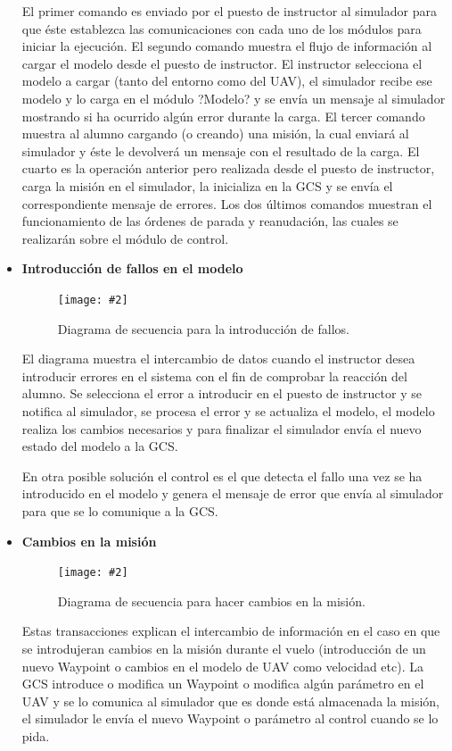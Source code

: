 \documentclass[12pt,a4paper,spanish]{book} %
\newcommand{\imgCentradaGrande}[3]{
\begin{figure}[H]
\begin{center}
\texttt{[image: \#2]}
\caption{#3}
\label{#1}
\end{center}
\end{figure}
}
\begin{document}
\begin{itemize}
El primer comando es enviado por el puesto de instructor al simulador para que éste establezca las comunicaciones con cada uno de los módulos para iniciar la ejecución.
El segundo comando muestra el flujo de información al cargar el modelo desde el puesto de instructor. El instructor selecciona el modelo a cargar (tanto del entorno como del UAV), el simulador recibe ese modelo y lo carga en el módulo ?Modelo? y se envía un mensaje al simulador mostrando si ha ocurrido algún error durante la carga.
El tercer comando muestra al alumno cargando (o creando) una misión, la cual enviará al simulador y éste le devolverá un mensaje con el resultado de la carga.
El cuarto es la operación anterior pero realizada desde el puesto de instructor, carga la misión en el simulador, la inicializa en la GCS y se envía el correspondiente mensaje de errores.
Los dos últimos comandos muestran el funcionamiento de las órdenes de parada y reanudación, las cuales se realizarán sobre el módulo de control.

\item\textbf{Introducción de fallos en el modelo}

\imgCentradaGrande{fig.4.5}{img/introduccionfallos.eps}{Diagrama de secuencia para la introducción de fallos.}

El diagrama muestra el intercambio de datos cuando el instructor desea introducir errores en el sistema con el fin de comprobar la reacción del alumno. Se selecciona el error a introducir en el puesto de instructor y se notifica al simulador, se procesa el error y se actualiza el modelo, el modelo realiza los cambios necesarios y para finalizar el simulador envía el nuevo estado del modelo a la GCS.

En otra posible solución el control es el que detecta el fallo una vez se ha introducido en el modelo y genera el mensaje de error que envía al simulador para que se lo comunique a la GCS.

\item\textbf{Cambios en la misión}

\imgCentradaGrande{fig.4.6}{img/cambiosmision.eps}{Diagrama de secuencia para hacer cambios en la misión.}

Estas transacciones explican el intercambio de información en el caso en que se introdujeran cambios en la misión durante el vuelo (introducción de un nuevo Waypoint o cambios en el modelo de UAV como velocidad etc). La GCS introduce o modifica un Waypoint o modifica algún parámetro en el UAV y se lo comunica al simulador que es donde está almacenada la misión, el simulador le envía el nuevo Waypoint o parámetro al control cuando se lo pida.

\end{itemize}
\end{document}

